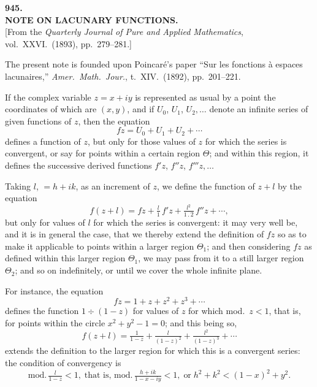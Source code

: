 \documentclass[11pt]{article}
\begin{document}
\bigskip

\begin{center}
\textbf{\large 945.}\\[4pt]
\textbf{NOTE ON LACUNARY FUNCTIONS.}\\[6pt]
[From the \textit{Quarterly Journal of Pure and Applied Mathematics}, vol.\ XXVI.\ (1893), pp.\ 279--281.]
\end{center}

\medskip
The present note is founded upon Poincar\'{e}'s paper ``Sur les fonctions \`{a} espaces lacunaires,'' \textit{Amer.\ Math.\ Jour.}, t.\ XIV.\ (1892), pp.\ 201--221.

If the complex variable $z = x + iy$ is represented as usual by a point the coordinates of which are $(x,y)$, and if $U_{0}$, $U_{1}$, $U_{2},\ldots$ denote an infinite series of given functions of $z$, then the equation
\[ fz = U_{0} + U_{1} + U_{2} + \cdots \]
defines a function of $z$, but only for those values of $z$ for which the series is convergent, or say for points within a certain region $\Theta$; and within this region, it defines the successive derived functions $f'z$, $f''z$, $f'''z,\ldots$

Taking $l$, $= h + ik$, as an increment of $z$, we define the function of $z + l$ by the equation
\[ f(z + l) = fz + \tfrac{l}{1}\,f'z + \tfrac{l^{2}}{1\,.\,2}\,f''z + \cdots, \]
but only for values of $l$ for which the series is convergent: it may very well be, and it is in general the case, that we thereby extend the definition of $fz$ so as to make it applicable to points within a larger region $\Theta_{1}$; and then considering $fz$ as defined within this larger region $\Theta_{1}$, we may pass from it to a still larger region $\Theta_{2}$; and so on indefinitely, or until we cover the whole infinite plane.

For instance, the equation
\[ fz = 1 + z + z^{2} + z^{3} + \cdots \]
defines the function $1 \div (1 - z)$ for values of $z$ for which mod.\ $z < 1$, that is, for points within the circle $x^{2} + y^{2} - 1 = 0$; and this being so,
\[ f(z+l) = \tfrac{1}{1 - z} + \tfrac{l}{(1 - z)^{2}} + \tfrac{l^{2}}{(1 - z)^{3}} + \cdots \]
extends the definition to the larger region for which this is a convergent series: the condition of convergency is
\[ \text{mod.}\,\tfrac{l}{1 - z} < 1,\;\text{that is, mod.}\,\tfrac{h + ik}{1 - x - iy} < 1,\;\text{or}\;h^{2} + k^{2} < (1 - x)^{2} + y^{2}. \]
\end{document}
